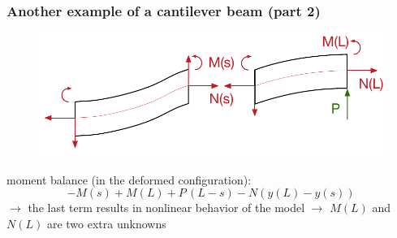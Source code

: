 \begin{frame}
  \frametitle{Another example of a cantilever beam (part 2)}
  
  \vspace{-0.7em}
  \begin{figure}
    \centering
    \includegraphics[width=20cm, keepaspectratio=true]{sections/traditional_beams/images/TimoshenkoCanitleverExample2part2}
  \end{figure}
  
  moment balance (in the deformed configuration):
  \begin{displaymath}
    -M(s) + M(L) + P \, (L-s) - N(y(L)-y(s))
  \end{displaymath}
  $\rightarrow$ the last term results in nonlinear behavior of the model \newline
  $\rightarrow$ $M(L)$ and $N(L)$ are two extra unknowns
\end{frame}